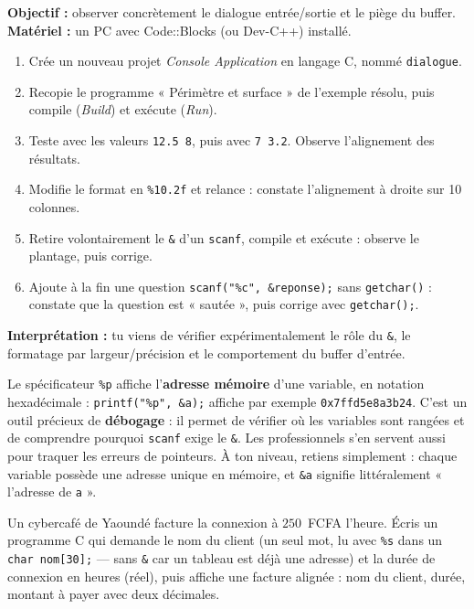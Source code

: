 \documentclass[11pt]{article}
\begin{document}
\begin{experience}
\textbf{Objectif :} observer concrètement le dialogue entrée/sortie et le piège du buffer.
\textbf{Matériel :} un PC avec Code::Blocks (ou Dev-C++) installé.
\begin{enumerate}
  \item Crée un nouveau projet \emph{Console Application} en langage C, nommé \texttt{dialogue}.
  \item Recopie le programme « Périmètre et surface » de l'exemple résolu, puis compile (\emph{Build}) et exécute (\emph{Run}).
  \item Teste avec les valeurs \texttt{12.5 8}, puis avec \texttt{7 3.2}. Observe l'alignement des résultats.
  \item Modifie le format en \texttt{\%10.2f} et relance : constate l'alignement à droite sur 10 colonnes.
  \item Retire volontairement le \texttt{\&} d'un \texttt{scanf}, compile et exécute : observe le plantage, puis corrige.
  \item Ajoute à la fin une question \texttt{scanf("\%c", \&reponse);} sans \texttt{getchar()} : constate que la question est « sautée », puis corrige avec \texttt{getchar();}.
\end{enumerate}
\textbf{Interprétation :} tu viens de vérifier expérimentalement le rôle du \texttt{\&}, le formatage par largeur/précision et le comportement du buffer d'entrée.
\end{experience}

\begin{savaistu}
Le spécificateur \texttt{\%p} affiche l'\textbf{adresse mémoire} d'une variable, en notation hexadécimale : \texttt{printf("\%p", \&a);} affiche par exemple \texttt{0x7ffd5e8a3b24}. C'est un outil précieux de \textbf{débogage} : il permet de vérifier où les variables sont rangées et de comprendre pourquoi \texttt{scanf} exige le \texttt{\&}. Les professionnels s'en servent aussi pour traquer les erreurs de pointeurs. À ton niveau, retiens simplement : chaque variable possède une adresse unique en mémoire, et \texttt{\&a} signifie littéralement « l'adresse de \texttt{a} ».
\end{savaistu}

\begin{exercice}
Un cybercafé de Yaoundé facture la connexion à $250$~FCFA l'heure. Écris un programme C qui demande le nom du client (un seul mot, lu avec \texttt{\%s} dans un \texttt{char nom[30];} — sans \texttt{\&} car un tableau est déjà une adresse) et la durée de connexion en heures (réel), puis affiche une facture alignée : nom du client, durée, montant à payer avec deux décimales.
\end{exercice}
\end{document}
